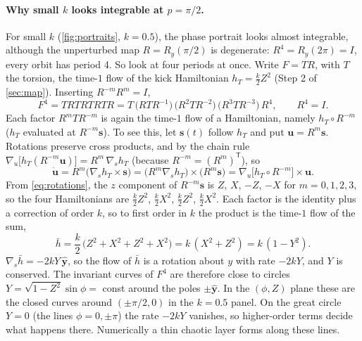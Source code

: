 \documentclass[11pt,a4paper]{article}
\newcommand{\vs}{\bm{s}}
\begin{document}
\paragraph{Why small $k$ looks integrable at $p = \pi/2$.} For small $k$ (\cref{fig:portraits}, $k=0.5$), the phase
portrait looks almost integrable, although the unperturbed map $R = R_y(\pi/2)$ is degenerate: $R^4 = R_y(2\pi) = I$,
every orbit has period 4. So look at four periods at once. Write $F = TR$, with $T$ the torsion, the time-$1$ flow of
the kick Hamiltonian $h_T = \frac k2 Z^2$ (Step 2 of \cref{sec:map}). Inserting $R^{-m}R^m = I$,
\begin{equation*}
  F^4 = TRTRTRTR = T\,\big(RTR^{-1}\big)\,\big(R^2TR^{-2}\big)\,\big(R^3TR^{-3}\big)\,R^4 ,
  \qquad R^4 = I .
\end{equation*}
Each factor $R^mTR^{-m}$ is again the time-$1$ flow of a Hamiltonian, namely $h_T\circ R^{-m}$ ($h_T$ evaluated at
$R^{-m}\vs$). To see this, let $\vs(t)$ follow $h_T$ and put $\bm u = R^m\vs$. Rotations preserve cross products, and by
the chain rule $\nabla_{\!u}\big[h_T(R^{-m}\bm u)\big] = R^m\,\nabla_{\!s}h_T$ (because $R^{-m} = (R^m)^{\mathsf T}$),
so
\begin{equation*}
  \dot{\bm u} = R^m\big(\nabla_{\!s}h_T\times\vs\big) = \big(R^m\nabla_{\!s}h_T\big)\times\big(R^m\vs\big)
  = \nabla_{\!u}\big[h_T\circ R^{-m}\big]\times\bm u .
\end{equation*}
From \eqref{eq:rotations}, the $z$ component of $R^{-m}\vs$ is $Z$, $X$, $-Z$, $-X$ for $m = 0, 1, 2, 3$, so the four
Hamiltonians are $\frac k2 Z^2$, $\frac k2X^2$, $\frac k2 Z^2$, $\frac k2X^2$. Each factor is the identity plus a
correction of order $k$, so to first order in $k$ the product is the time-$1$ flow of the sum,
\begin{equation}\label{eq:hbar}
  \bar h = \frac{k}{2}\,\big(Z^2 + X^2 + Z^2 + X^2\big) = k\,(X^2 + Z^2) = k\,(1 - Y^2).
\end{equation}
$\nabla_{\!s}\bar h = -2kY\,\hat{\bm y}$, so the flow of $\bar h$ is a rotation about $y$ with rate $-2kY$, and $Y$ is
conserved. The invariant curves of $F^4$ are therefore close to circles $Y = \sqrt{1-Z^2}\sin\phi = $ const around the
poles $\pm\hat{\bm y}$. In the $(\phi,Z)$ plane these are the closed curves around $(\pm\pi/2, 0)$ in the $k=0.5$
panel. On the great circle $Y = 0$ (the lines $\phi = 0, \pm\pi$) the rate $-2kY$ vanishes, so higher-order terms
decide what happens there. Numerically a thin chaotic layer forms along these lines.
\end{document}
